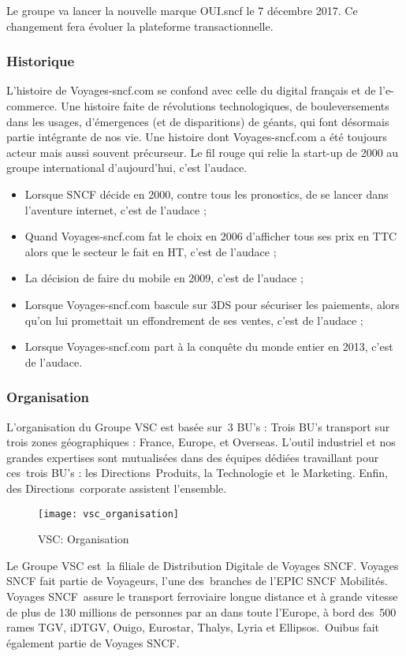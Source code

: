 Le groupe va lancer la nouvelle marque OUI.sncf le 7 décembre 2017.
Ce changement fera évoluer la plateforme transactionnelle.

\subsubsection{Historique}
L'histoire de Voyages-sncf.com se confond avec celle du digital français et de l'e-commerce.
Une histoire faite de révolutions technologiques, de bouleversements dans les usages, d'émergences (et de disparitions) de géants,
qui font désormais partie intégrante de nos vie. Une histoire dont Voyages-sncf.com a été toujours acteur mais aussi souvent précurseur.
Le fil rouge qui relie la start-up de 2000 au groupe international d'aujourd'hui, c'est l'audace.
\begin{itemize}
 \item Lorsque SNCF décide en 2000, contre tous les pronostics, de se lancer dans l'aventure internet, c'est de l'audace ;
 \item Quand Voyages-sncf.com fat le choix en 2006 d'afficher tous ses prix en TTC alors que le secteur le fait en HT, c'est de l'audace ;
 \item La décision de faire du mobile en 2009, c'est de l'audace ;
 \item Lorsque Voyages-sncf.com bascule sur 3DS pour sécuriser les paiements, alors qu'on lui promettait un effondrement de ses ventes, c'est de l'audace ;
 \item Lorsque Voyages-sncf.com part à la conquête du monde entier en 2013, c'est de l'audace.
\end{itemize}

\subsubsection{Organisation}
L'organisation du Groupe VSC est basée sur 3 BU’s :
Trois BU’s transport sur trois zones géographiques : France, Europe, et Overseas.
L’outil industriel et nos grandes expertises sont mutualisées dans des équipes dédiées travaillant pour ces trois BU’s : les Directions Produits, la Technologie et le Marketing. Enfin, des Directions corporate assistent l'ensemble.

\begin{figure}[ht]
 \centering
 \texttt{[image: vsc\_organisation]}
 \caption{VSC: Organisation}
\end{figure}

Le Groupe VSC est la filiale de Distribution Digitale de Voyages SNCF.
Voyages SNCF fait partie de Voyageurs, l'une des branches de l'EPIC SNCF Mobilités. 
Voyages SNCF assure le transport ferroviaire longue distance et à grande vitesse de plus de 130 millions de personnes par an dans toute l’Europe, à bord des 500  rames TGV, iDTGV, Ouigo, Eurostar, Thalys, Lyria et Ellipsos. Ouibus fait également partie de Voyages SNCF.

